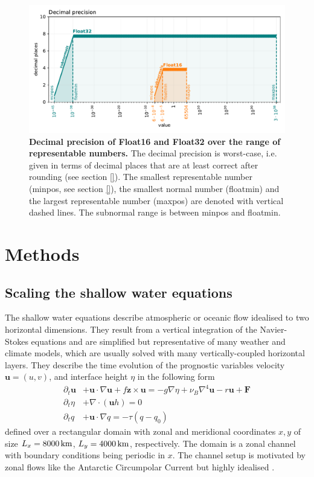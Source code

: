 \begin{figure}[tbhp]
	\includegraphics[width=1\textwidth]{Figures/a64fx/float32_16_decprec.pdf}
	\caption{\textbf{Decimal precision of Float16 and Float32 over the range of representable numbers.}
	The decimal precision is worst-case, i.e. given in terms of decimal places that are at least correct after rounding (see section \ref{}).
	The smallest representable number (minpos, see section \ref{}), the smallest normal number (floatmin) and the largest representable number
	(maxpos) are denoted with vertical dashed lines. The subnormal range is between minpos and floatmin.}
	\label{fig:a64fx_decprec}
\end{figure}

\section{Methods}
\label{sec:hardware_methods}

\subsection{Scaling the shallow water equations}
\label{sec:swm_scaling}

The shallow water equations describe atmospheric or oceanic flow idealised to two horizontal dimensions. They result from
a vertical integration of the Navier-Stokes equations \citep{Gill1982,Vallis2006} and are simplified but representative of many
weather and climate models, which are usually solved with many vertically-coupled horizontal layers. They describe the time
evolution of the prognostic variables velocity $\mathbf{u} = (u,v)$, and interface height $\eta$  in the following form 
\begin{align}
\partial_t\mathbf{u} &+ \mathbf{u} \cdot \nabla \mathbf{u} + f\mathbf{z} \times \mathbf{u} =
-g\nabla \eta + \nu_B \nabla^4 \mathbf{u} - r \mathbf{u} + \mathbf{F} \nonumber \\
\partial_t\eta &+ \nabla \cdot (\mathbf{u}h) = 0 \nonumber \\ 
\partial_tq &+ \mathbf{u} \cdot \nabla q = -\tau(q-q_0)
\end{align}
defined over a rectangular domain with zonal and meridional coordinates $x,y$ of size $L_x = 8000\operatorname{km}$,
$L_y  = 4000\operatorname{km}$, respectively. The domain is a zonal channel with boundary conditions being periodic in $x$.
The channel setup is motivated by zonal flows like the Antarctic Circumpolar Current but highly idealised \citep{Jansen2015,Jansen2015a}.

